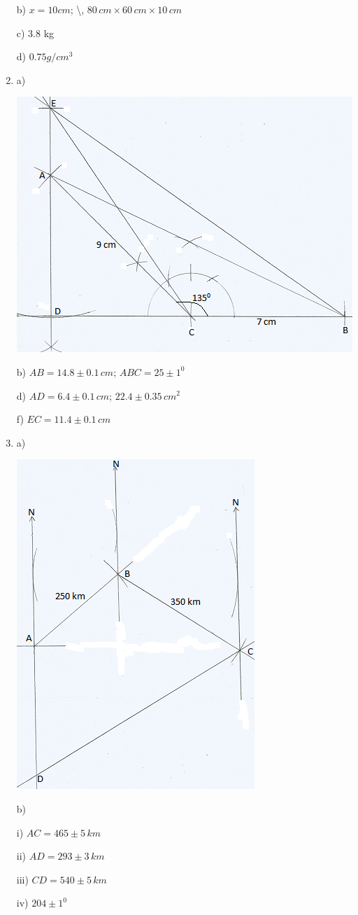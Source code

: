 \documentclass[
  a4paperpaper,
]{scrbook}
\begin{document}
\begin{tcolorbox}
\begin{enumerate}
  b) \(x=10 cm\); \textbackslash, \(80\,cm\times60\,cm\times10\,cm\)

  c) 3.8 kg

  d) \(0.75 g/cm^3\)
\item
  a)

  \includegraphics{figures/Md8_N20.png}

  b) \(AB=14.8\pm0.1\,cm\); \(ABC =25\pm1^0\)

  d) \(AD=6.4\pm0.1\,cm\); \(22.4\pm0.35\,cm^2\)

  f) \(EC=11.4\pm0.1 \,cm\)
\item
  a)

  \includegraphics{figures/Md8_N21.png}

  b)

  i) \(AC=465\pm5\,km\)

  ii) \(AD=293\pm3\,km\)

  iii) \(CD=540\pm5\,km\)

  iv) \(204\pm1^0\)
\end{enumerate}

\end{tcolorbox}
\end{document}

